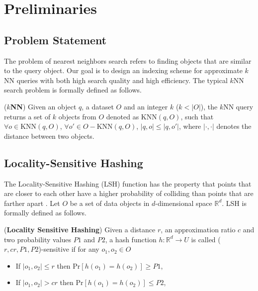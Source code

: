 \section{Preliminaries}
\label{sec:pre}

\subsection{Problem Statement}

The problem of nearest neighbors search refers to finding objects that are similar to the query object. Our goal is to design an indexing scheme for approximate $k$NN queries with both high search quality and high efficiency. The typical $k$NN search problem is formally defined as follows.

\begin{definition}
\label{def:knn}
(\textbf{$k$NN}) Given an object $q$, a dataset $O$ and an integer $k$ ($k<|O|$), the $k$NN query returns a set of $k$ objects from $O$ denoted as $\text{KNN}(q,O)$, such that $\forall o\in \text{KNN}(q,O)$, $\forall o'\in O-\text{KNN}(q,O)$, $|q,o|\leq|q,o'|$, where $|\cdot,\cdot|$ denotes the distance between two objects.
\end{definition}


\subsection{Locality-Sensitive Hashing}

The Locality-Sensitive Hashing (LSH) function has the property that points that are closer to each other have a higher probability of colliding than points that are farther apart \cite{orilsh}. Let $O$ be a set of data objects in $d$-dimensional space $\mathbb{R}^d$. LSH is formally defined as
follows.

\begin{definition}
\label{def:lsh}
(\textbf{Locality Sensitive Hashing}) Given a distance $r$, an approximation ratio $c$ and two probability values $P1$ and $P2$, a hash function $h:\mathbb{R}^d\rightarrow U$ is called ($r,cr,P1,P2$)-sensitive if for any $o_1,o_2\in O$
\begin{itemize}
  \item If $|o_1,o_2|\leq r$ then $\text{Pr}[h(o_1)=h(o_2)]\geq P1$,
  \item If $|o_1,o_2|> cr$ then $\text{Pr}[h(o_1)=h(o_2)]\leq P2$,
\end{itemize}
\end{definition}


